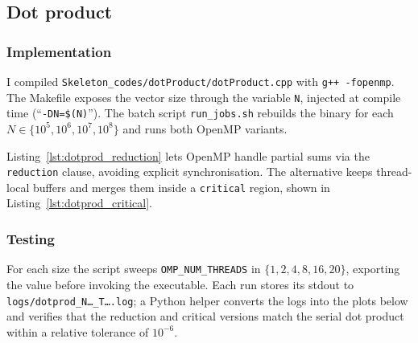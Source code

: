 \subsection{Dot product}

\subsubsection{Implementation}
I compiled \texttt{Skeleton\_codes/dotProduct/dotProduct.cpp} with \texttt{g++ -fopenmp}. The Makefile exposes the vector size through the variable \texttt{N}, injected at compile time (``\texttt{-DN=\$(N)}''). The batch script \texttt{run\_jobs.sh} rebuilds the binary for each $N \in \{10^5,10^6,10^7,10^8\}$ and runs both OpenMP variants.



Listing~\ref{lst:dotprod_reduction} lets OpenMP handle partial sums via the \texttt{reduction} clause, avoiding explicit synchronisation. The alternative keeps thread-local buffers and merges them inside a \texttt{critical} region, shown in Listing~\ref{lst:dotprod_critical}.




\subsubsection{Testing}
For each size the script sweeps \texttt{OMP\_NUM\_THREADS} in $\{1,2,4,8,16,20\}$, exporting the value before invoking the executable. Each run stores its stdout to \texttt{logs/dotprod\_N\ldots\_T\ldots.log}; a Python helper converts the logs into the plots below and verifies that the reduction and critical versions match the serial dot product within a relative tolerance of $10^{-6}$.

